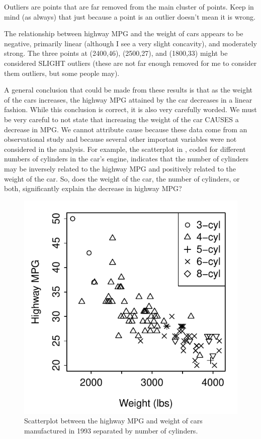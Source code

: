 \documentclass[10pt,openany]{book}\usepackage[]{graphicx}\usepackage[]{color}
\newenvironment{knitrout}{}{} %
\begin{document}

\vspace{-12pt}

Outliers are points that are far removed from the main cluster of points.  Keep in mind (as always) that just because a point is an outlier doesn't mean it is wrong.

The relationship between highway MPG and the weight of cars  appears to be negative, primarily linear (although I see a very slight concavity), and moderately strong.  The three points at (2400,46), (2500,27), and (1800,33) might be considered SLIGHT outliers (these are not far enough removed for me to consider them outliers, but some people may).

A general conclusion that could be made from these results is that as the weight of the cars increases, the highway MPG attained by the car decreases in a linear fashion.  While this conclusion is correct, it is also very carefully worded.  We must be very careful to not state that increasing the weight of the car CAUSES a decrease in MPG.  We cannot attribute cause because these data come from an observational study and because several other important variables were not considered in the analysis.  For example, the scatterplot in , coded for different numbers of cylinders in the car's engine, indicates that the number of cylinders may be inversely related to the highway MPG and positively related to the weight of the car.  So, does the weight of the car, the number of cylinders, or both, significantly explain the decrease in highway MPG?

\begin{knitrout}
\color{fgcolor}\begin{figure}[hbtp]

{\centering \includegraphics[width=.4\linewidth]{Figs/carscat2-1} 

}

\caption[Scatterplot between the highway MPG and weight of cars manufactured in 1993 separated by number of cylinders]{Scatterplot between the highway MPG and weight of cars manufactured in 1993 separated by number of cylinders.}\label{fig:carscat2}
\end{figure}


\end{knitrout}
\end{document}
